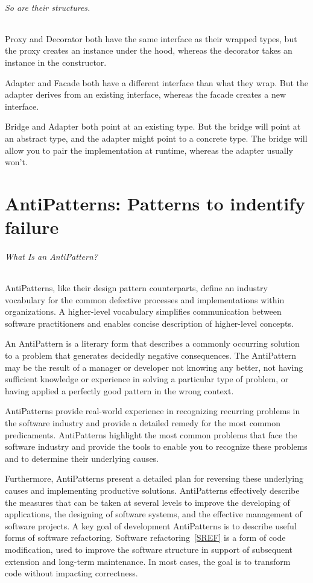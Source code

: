\documentclass{book}
\newcounter{subpart}
\begin{document}
\paragraph{So are their structures.}

    Proxy and Decorator both have the same interface as their wrapped types, but the proxy creates an instance under the hood, whereas the decorator takes an instance in the constructor.

    Adapter and Facade both have a different interface than what they wrap. But the adapter derives from an existing interface, whereas the facade creates a new interface.

    Bridge and Adapter both point at an existing type. But the bridge will point at an abstract type, and the adapter might point to a concrete type.
    The bridge will allow you to pair the implementation at runtime, whereas the adapter usually won't.


\part{AntiPatterns: Patterns to indentify failure}
\paragraph{What Is an AntiPattern?}\mbox{}
AntiPatterns, like their design pattern counterparts, define an industry vocabulary for the common defective processes and implementations within organizations.
A higher-level vocabulary simplifies communication between software practitioners and enables concise description of higher-level concepts.

An AntiPattern is a literary form that describes a commonly occurring solution to a problem that generates decidedly negative consequences.
The AntiPattern may be the result of a manager or developer not knowing any better, not having sufficient knowledge or experience in solving a particular type of problem,
or having applied a perfectly good pattern in the wrong context.

AntiPatterns provide real-world experience in recognizing recurring problems in the software industry and provide a detailed remedy for the most common predicaments.
AntiPatterns highlight the most common problems that face the software industry and provide the tools to enable you to recognize these problems and to determine their underlying causes.

Furthermore, AntiPatterns present a detailed plan for reversing these underlying causes and implementing productive solutions.
AntiPatterns effectively describe the measures that can be taken at several levels to improve the developing of applications,
the designing of software systems, and the effective management of software projects. 
\label{SDA}
A key goal of development AntiPatterns is to describe useful forms of software refactoring.
Software refactoring~\ref{SREF} is a form of code modification, used to improve the software structure in support of subsequent extension and long-term maintenance.
In most cases, the goal is to transform code without impacting correctness.
\end{document}
